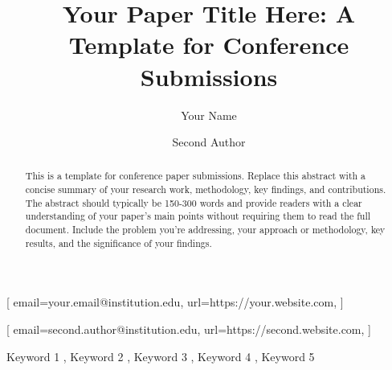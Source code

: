 \documentclass[
hf,
]{confart}
\begin{document}




\title{Your Paper Title Here: A Template for Conference Submissions}


\author[1]{Your Name}[%
email=your.email@institution.edu,
url=https://your.website.com,
]
\fnmark[1]

\author[1]{Second Author}[%
email=second.author@institution.edu,
url=https://second.website.com,
]
\cormark[1]
\fnmark[1]

\fnmark[1]
\address[1]{Your Institution,
  Your Address, City, Country}


\begin{abstract}
  This is a template for conference paper submissions. Replace this abstract with a concise summary of your research work, methodology, key findings, and contributions. The abstract should typically be 150-300 words and provide readers with a clear understanding of your paper's main points without requiring them to read the full document. Include the problem you're addressing, your approach or methodology, key results, and the significance of your findings.
\end{abstract}

\begin{keywords}
  Keyword 1 \sep
  Keyword 2 \sep
  Keyword 3 \sep
  Keyword 4 \sep
  Keyword 5
\end{keywords}
\end{document}
